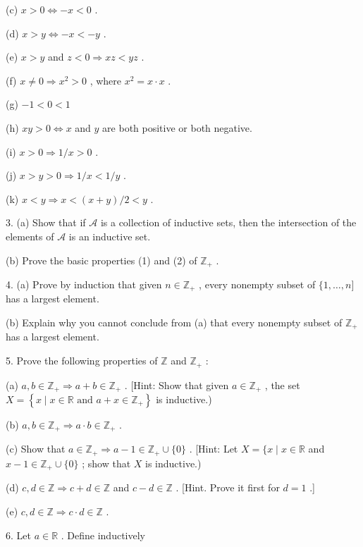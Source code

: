 \documentclass[10pt]{article}
\begin{document}
(c) \(x > 0 \Leftrightarrow   - x < 0\) .

(d) \(x > y \Leftrightarrow   - x <  - y\) .

(e) \(x > y\) and \(z < 0 \Rightarrow  {xz} < {yz}\) .

(f) \(x \neq  0 \Rightarrow  {x}^{2} > 0\) , where \({x}^{2} = x \cdot  x\) .

(g) \(- 1 < 0 < 1\)

(h) \({xy} > 0 \Leftrightarrow  x\) and \(y\) are both positive or both negative.

(i) \(x > 0 \Rightarrow  1/x > 0\) .

(j) \(x > y > 0 \Rightarrow  1/x < 1/y\) .

(k) \(x < y \Rightarrow  x < \left( {x + y}\right) /2 < y\) .

3. (a) Show that if \(\mathcal{A}\) is a collection of inductive sets, then the intersection of the elements of \(\mathcal{A}\) is an inductive set.

(b) Prove the basic properties (1) and (2) of \({\mathbb{Z}}_{ + }\) .

4. (a) Prove by induction that given \(n \in  {\mathbb{Z}}_{ + }\) , every nonempty subset of \(\{ 1,\ldots ,n\rbrack\) has a largest element.

(b) Explain why you cannot conclude from (a) that every nonempty subset of \({\mathbb{Z}}_{ + }\) has a largest element.

5. Prove the following properties of \(\mathbb{Z}\) and \({\mathbb{Z}}_{ + }\) :

(a) \(a,b \in  {\mathbb{Z}}_{ + } \Rightarrow  a + b \in  {\mathbb{Z}}_{ + }\) . [Hint: Show that given \(a \in  {\mathbb{Z}}_{ + }\) , the set \(X = \left\{  {x \mid  x \in  \mathbb{R}\text{ and }a + x \in  {\mathbb{Z}}_{ + }}\right\}\) is inductive.)

(b) \(a,b \in  {\mathbb{Z}}_{ + } \Rightarrow  a \cdot  b \in  {\mathbb{Z}}_{ + }\) .

(c) Show that \(a \in  {\mathbb{Z}}_{ + } \Rightarrow  a - 1 \in  {\mathbb{Z}}_{ + } \cup  \{ 0\}\) . [Hint: Let \(X = \{ x \mid  x \in  \mathbb{R}\) and \(x - 1 \in  {\mathbb{Z}}_{ + } \cup  \{ 0\}\) ; show that \(X\) is inductive.)

(d) \(c,d \in  \mathbb{Z} \Rightarrow  c + d \in  \mathbb{Z}\) and \(c - d \in  \mathbb{Z}\) . [Hint. Prove it first for \(d = 1\) .]

(e) \(c,d \in  \mathbb{Z} \Rightarrow  c \cdot  d \in  \mathbb{Z}\) .

6. Let \(a \in  \mathbb{R}\) . Define inductively
\end{document}
